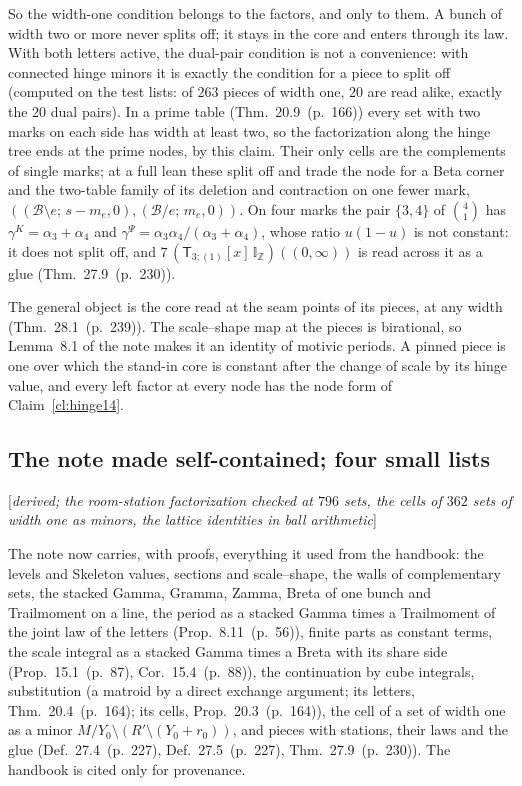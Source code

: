 \documentclass[11pt]{article}
\newcommand{\cB}{\mathcal B}
\newcommand{\sT}{\mathsf T}
\newcommand{\IZ}{\mathbb I_{\mathbb Z}}
\newcommand{\Tx}[3]{(\sT_{#1;(1)}[x]\,#2)((#3,\infty))}
\newcommand{\status}[1]{\hfill{\small[\textit{#1}]}}
\newcommand{\hb}[2]{#1~(p.~#2)}   %
\theoremstyle{plain}
\theoremstyle{remark}
\begin{document}
So the width-one condition belongs to the factors, and only to them. A bunch of width two or more never splits off; it stays in the core and enters through its law. With both letters active, the dual-pair condition is not a convenience: with connected hinge minors it is exactly the condition for a piece to split off (computed on the test lists: of $263$ pieces of width one, $20$ are read alike, exactly the $20$ dual pairs). In a prime table (Thm.~\hb{20.9}{166}) every set with two marks on each side has width at least two, so the factorization along the hinge tree ends at the prime nodes, by this claim. Their only cells are the complements of single marks; at a full lean these split off and trade the node for a Beta corner and the two-table family of its deletion and contraction on one fewer mark, $((\cB\setminus e;\,s-m_e,0),(\cB/e;\,m_e,0))$. On four marks the pair $\{3,4\}$ of $\binom41$ has $\gamma^K=\alpha_3+\alpha_4$ and $\gamma^\Psi=\alpha_3\alpha_4/(\alpha_3+\alpha_4)$, whose ratio $u(1-u)$ is not constant: it does not split off, and $7\,\Tx3{\IZ}0$ is read across it as a glue (Thm.~\hb{27.9}{230}).

The general object is the core read at the seam points of its pieces, at any width (Thm.~\hb{28.1}{239}). The scale--shape map at the pieces is birational, so Lemma~8.1 of the note makes it an identity of motivic periods. A pinned piece is one over which the stand-in core is constant after the change of scale by its hinge value, and every left factor at every node has the node form of Claim~\ref{cl:hinge14}.

\subsection{The note made self-contained; four small lists}\status{derived; the room-station factorization checked at $796$ sets, the cells of $362$ sets of width one as minors, the lattice identities in ball arithmetic}

The note now carries, with proofs, everything it used from the handbook: the levels and Skeleton values, sections and scale--shape, the walls of complementary sets, the stacked Gamma, Gramma, Zamma, Breta of one bunch and Trailmoment on a line, the period as a stacked Gamma times a Trailmoment of the joint law of the letters (Prop.~\hb{8.11}{56}), finite parts as constant terms, the scale integral as a stacked Gamma times a Breta with its share side (Prop.~\hb{15.1}{87}, Cor.~\hb{15.4}{88}), the continuation by cube integrals, substitution (a matroid by a direct exchange argument; its letters, Thm.~\hb{20.4}{164}; its cells, Prop.~\hb{20.3}{164}), the cell of a set of width one as a minor $M/Y_0\setminus(R'\setminus(Y_0+r_0))$, and pieces with stations, their laws and the glue (Def.~\hb{27.4}{227}, Def.~\hb{27.5}{227}, Thm.~\hb{27.9}{230}). The handbook is cited only for provenance.
\end{document}
